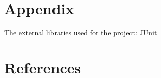 \documentclass{article}[11pt,Tahoma]
\begin{document}
	\section{Appendix}
		The external libraries used for the project:  
		JUnit
	\section{References}	~
\end{document}
